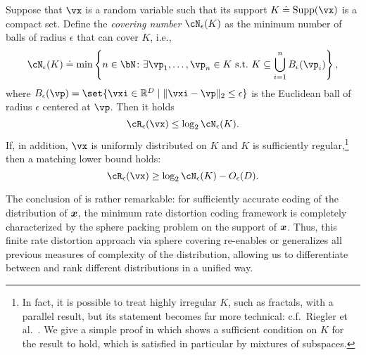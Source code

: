 \documentclass[../../book-main.tex]{subfiles}
\begin{document}
\begin{proposition}\label{prop:covering-number-rate-distortion}
	Suppose that \(\vx\) is a random variable such that its support \(K \doteq \Supp(\vx)\) is a compact set. Define the \textit{covering number} \(\cN_{\epsilon}(K)\) as the minimum number of balls of radius \(\epsilon\) that can cover \(K\), i.e.,
	\begin{equation}
		\cN_{\epsilon}(K) \doteq \min\left\{n \in \bN \colon \exists \vp_{1}, \dots, \vp_{n} \in K\ \text{s.t.}\ K \subseteq \bigcup_{i = 1}^{n}B_{\epsilon}(\vp_{i})\right\},
	\end{equation}
	where \(B_{\epsilon}(\vp) = \set{\vxi\in \R^D \given \norm{\vxi - \vp}_2 \leq
	\epsilon}\) is the Euclidean ball of radius \(\epsilon\) centered at \(\vp\).
	Then it holds 
	\begin{equation}
		\cR_{\epsilon}(\vx) 
		\leq \log_{2} \cN_{\epsilon}(K).
	\end{equation}
	If, in addition, $\vx$ is uniformly distributed on $K$ and $K$ is
	sufficiently regular,\footnote{In fact, it is possible to treat highly
	irregular $K$, such as fractals, with a parallel result, but its statement
	becomes far more technical: c.f.\ Riegler et al.\
	\cite{Riegler2018-jh,Riegler2023-rr}. We give a simple proof in 
	which shows a sufficient condition on $K$ for the result to hold, which
	is satisfied in particular by mixtures of subspaces.}
	then a matching lower bound holds:
	\begin{equation}
		\cR_{\epsilon}(\vx)
		\geq
		\log_{2} \cN_{\epsilon}(K) - O_{\epsilon}(D).
	\end{equation}
\end{proposition}

%

The conclusion of  is rather
remarkable: for sufficiently accurate coding of the distribution of
$\bm{x}$, the minimum rate distortion coding framework is completely characterized
by the sphere packing problem on the support of $\bm{x}$. 
Thus, this finite rate distortion approach via sphere covering re-enables or
generalizes all previous measures of complexity of the distribution, allowing us
to differentiate between and rank different distributions in a unified way.
\end{document}
